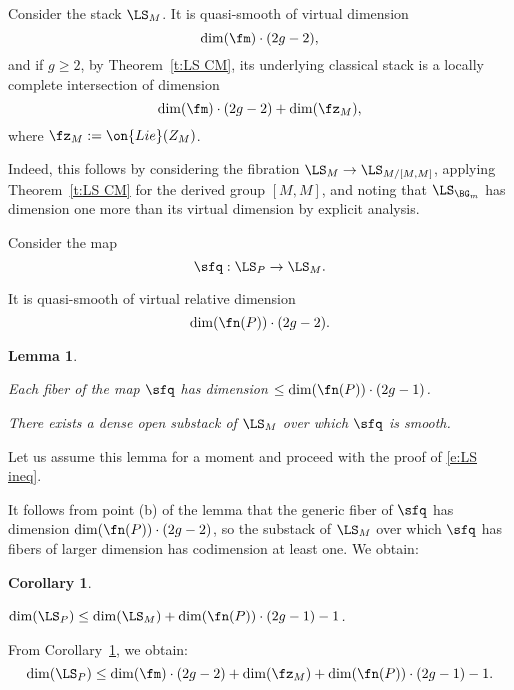 \documentclass[9pt]{amsart}
\newtheorem{cor}[subsubsection]{Corollary}
\newtheorem{lem}[subsubsection]{Lemma}
\theoremstyle{remark}
\theoremstyle{definition}
\theoremstyle{remark}
\newcommand{\thmref}[1]{Theorem~\ref{#1}}
\newcommand{\corref}[1]{Corollary~\ref{#1}}
\numberwithin{equation}{section}
\begin{document}
\sssec{}

Consider the stack $\LS_M$. It is quasi-smooth of virtual dimension 
$$\dim(\fm)\cdot (2g-2),$$
and if $g\geq 2$, by \thmref{t:LS CM}, its underlying classical
stack is a locally complete intersection of dimension
$$\dim(\fm)\cdot (2g-2)+\dim(\fz_M),$$
where $\fz_M:=\on{Lie}(Z_M)$.

\medskip

Indeed, this follows by considering the fibration
$\LS_M \to \LS_{M/[M,M]}$, applying \thmref{t:LS CM} for
the derived group $[M,M]$, and noting that
$\LS_{\BG_m}$ has dimension one more than its virtual
dimension by explicit analysis.

\sssec{}

Consider the map
\begin{equation} \label{e:q map}
\sfq:\LS_P\to \LS_M.
\end{equation}

It is quasi-smooth of virtual relative dimension 
$$\dim(\fn(P))\cdot (2g-2).$$

\begin{lem} \hfill \label{l:LS P estim}

\smallskip

 Each fiber of the map $\sfq$ has
dimension $\leq \dim(\fn(P))\cdot (2g-1)$.

\smallskip

 There exists a dense open substack of $\LS_M$
over which $\sfq$ is smooth.

\end{lem}

Let us assume this lemma for a moment and proceed with the proof of \eqref{e:LS ineq}. 

\medskip 

It follows from point (b) of the lemma that the generic fiber of $\sfq$ has dimension
$\dim(\fn(P))\cdot (2g-2)$, so the substack of $\LS_M$
over which $\sfq$ has fibers of larger dimension 
has codimension at least one. We obtain:

\begin{cor}\label{c:LS P estim}

$\dim(\LS_P) \leq \dim(\LS_M) + \dim(\fn(P))\cdot (2g-1) - 1$.

\end{cor}

\sssec{}

From \corref{c:LS P estim}, we obtain:
$$\dim(\LS_P)\leq \dim(\fm)\cdot (2g-2)+\dim(\fz_M) + \dim(\fn(P))\cdot (2g-1)-1.$$
\end{document}
